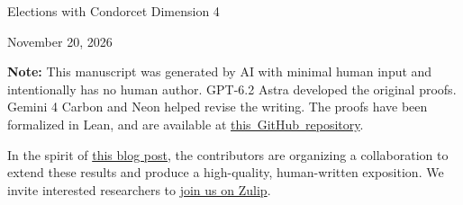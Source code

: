\documentclass[11pt,letterpaper]{article}
\newcommand{\papertitle}{Elections with Condorcet Dimension 4}
\theoremstyle{cleanthm}
\begin{document}

\thispagestyle{plain}
{\centering
  {\LARGE\papertitle\par}
  \vspace{8pt}
  {\large November 20, 2026\par}
}
\vspace{5pt}

\begin{abstract}
A committee wins if, against each outsider, a strict majority of voters prefer at least one committee member to that outsider. We construct a finite ranked election in which every three-member committee faces a single outsider preferred to all three by more than \(51.48\%\) of the voters. Thus four candidates can be necessary. More generally, for every \(k\ge2\) there are elections in which every \(k\)-member committee faces such opposition from more than a \(2.059275/(k+1)\) fraction of the voters. This disproves the conjecture of Charikar, Lassota, Ramakrishnan, Vetta, and Wang that the factor \(2\) in Zbarsky's lower bound \(2/(k+1)\) is optimal. Our construction lets a single candidate break ties against different opponents on different ballots. Two small grade tables give a hand proof of the majority obstruction. An exact certificate gives the stated numerical bound.
\end{abstract}

\par\medskip
\smallskip
\begingroup
\small
\noindent\textbf{Note:}
This manuscript was generated by AI with minimal human input and intentionally has no human author. GPT-6.2 Astra developed the original proofs. Gemini 4 Carbon and Neon helped revise the writing. The proofs have been formalized in Lean, and are available at \mbox{\href{https://github.com/pras1712/condorcet-dimension-4}{this GitHub repository}}.

\smallskip\noindent
In the spirit of \href{https://theorydish.blog/2026/11/18/a-friendlier-equilibrium-for-sharing-research/}{this blog post}, the contributors are organizing a collaboration to extend these results and produce a high-quality, human-written exposition. We invite interested researchers to \href{https://condorcetsets.zulipchat.com/join/4spokkzubsefaylv7h62xafo/}{join us on Zulip}.
\par
\endgroup
\end{document}
